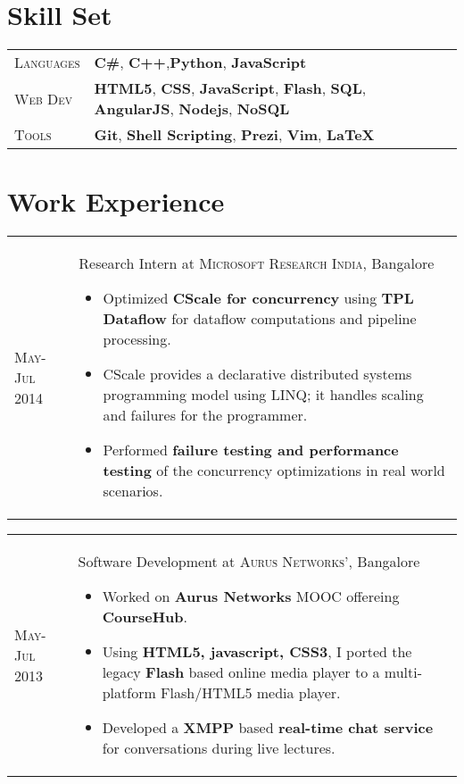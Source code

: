 \documentclass[a4paper,10pt]{article} %
\newcommand{\projectlist}[3]{
    \begin{tabular}{>{\raggedleft}p{2.2cm}|p{17cm}}
        \textsc{#1} & #2
                    \footnotesize{#3}
    \end{tabular}
}
\newcommand{\itemlist}[1]{
    \begin{tabular}{>{\raggedleft}p{2.2cm}p{17cm}}
        #1
    \end{tabular}
}
\begin{document}
\section{Skill Set}

\itemlist {
    \textsc{Languages} %
            & \textbf{C\#}, \textbf{C++},\textbf{Python}, \textbf{JavaScript} \\
    \textsc{Web Dev} %
            & \textbf{HTML5}, \textbf{CSS}, \textbf{JavaScript}, \textbf{Flash}, \textbf{SQL},
              \textbf{AngularJS}, \textbf{Nodejs}, \textbf{NoSQL}\\
    \textsc{Tools} %
            & \textbf{Git}, \textbf{Shell Scripting}, \textbf{Prezi}, \textbf{Vim}, \textbf{LaTeX}\\
}


\section{Work Experience}

\projectlist {May-Jul 2014}
         {Research Intern at \textsc{Microsoft Research India}, Bangalore}
         {
            \begin{itemize}[leftmargin=*]
                \item Optimized \textbf{CScale for concurrency} using \textbf{TPL Dataflow}
                    for dataflow computations and pipeline processing.
                \item CScale provides a declarative distributed systems programming
                    model using LINQ; it handles scaling and failures for the programmer.
                \item Performed \textbf{failure testing and performance testing}
                    of the concurrency optimizations in real world scenarios.
            \end{itemize}
        }

\projectlist {May-Jul 2013}
         {Software Development at \textsc{Aurus Networks'}, Bangalore}
         {
            \begin{itemize}[leftmargin=*]
                \item Worked on \textbf{Aurus Networks} MOOC offereing \textbf{CourseHub}.
                \item Using \textbf{HTML5, javascript, CSS3}, I ported the legacy
                      \textbf{Flash} based online media player to a multi-platform
                      Flash/HTML5 media player.
                  \item Developed a \textbf{XMPP} based \textbf{real-time chat service} for
                      conversations during live lectures.
            \end{itemize}
        }
\end{document}
